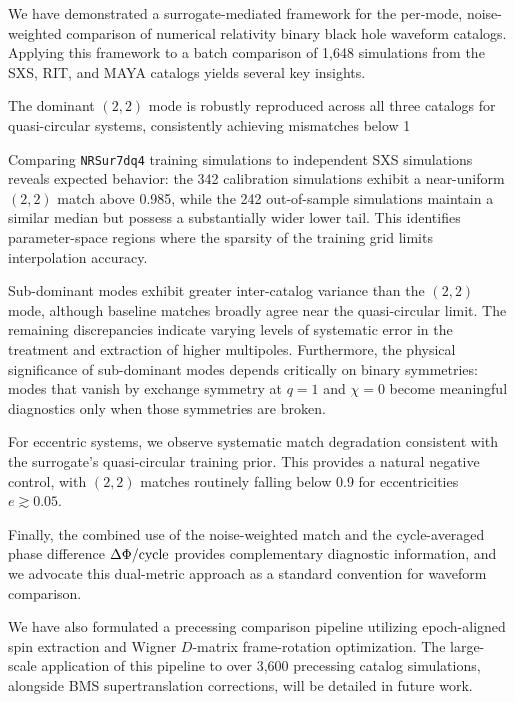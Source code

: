 \documentclass[%
 reprint,
superscriptaddress,
 amsmath,amssymb,
 aps,
]{revtex4-2}
\begin{document}
We have demonstrated a surrogate-mediated framework for the per-mode, noise-weighted comparison of numerical relativity binary black hole waveform catalogs. Applying this framework to a batch comparison of 1,648 simulations from the SXS, RIT, and MAYA catalogs yields several key insights.

The dominant $(2,2)$ mode is robustly reproduced across all three catalogs for quasi-circular systems, consistently achieving mismatches below 1%

Comparing \texttt{NRSur7dq4} training simulations to independent SXS simulations reveals expected behavior: the 342 calibration simulations exhibit a near-uniform $(2,2)$ match above 0.985, while the 242 out-of-sample simulations maintain a similar median but possess a substantially wider lower tail. This identifies parameter-space regions where the sparsity of the training grid limits interpolation accuracy.

Sub-dominant modes exhibit greater inter-catalog variance than the $(2,2)$ mode, although baseline matches broadly agree near the quasi-circular limit. The remaining discrepancies indicate varying levels of systematic error in the treatment and extraction of higher multipoles. Furthermore, the physical significance of sub-dominant modes depends critically on binary symmetries: modes that vanish by exchange symmetry at $q=1$ and $\chi=0$ become meaningful diagnostics only when those symmetries are broken.

For eccentric systems, we observe systematic match degradation consistent with the surrogate's quasi-circular training prior. This provides a natural negative control, with $(2,2)$ matches routinely falling below 0.9 for eccentricities $e \gtrsim 0.05$.

Finally, the combined use of the noise-weighted match and the cycle-averaged phase difference $\Delta\Phi/{\rm cycle}$ provides complementary diagnostic information, and we advocate this dual-metric approach as a standard convention for waveform comparison. 

We have also formulated a precessing comparison pipeline utilizing epoch-aligned spin extraction and Wigner $D$-matrix frame-rotation optimization. The large-scale application of this pipeline to over 3,600 precessing catalog simulations, alongside BMS supertranslation corrections, will be detailed in future work.
\end{document}

